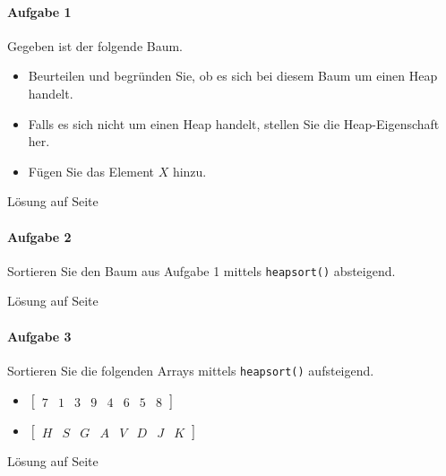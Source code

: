 \documentclass[11pt,a4paper]{scrartcl}
\begin{document}
\paragraph{Aufgabe 1} Gegeben ist der folgende Baum.
\begin{itemize}
\item Beurteilen und begründen Sie, ob es sich bei diesem Baum um einen Heap handelt.
\item Falls es sich nicht um einen Heap handelt, stellen Sie die Heap-Eigenschaft her.
\item Fügen Sie das Element $X$ hinzu.
\end{itemize}
\begin{figure}[h]
\centering
{}
\end{figure}
\begin{flushright}
Lösung auf Seite \pageref{a5.1:lsg} \\
\end{flushright}
\paragraph{Aufgabe 2} 
Sortieren Sie den Baum aus Aufgabe 1 mittels \texttt{heapsort()} absteigend.
\begin{flushright}
Lösung auf Seite \pageref{a5.2:lsg}
\end{flushright}
\paragraph{Aufgabe 3}
Sortieren Sie die folgenden Arrays mittels \texttt{heapsort()} aufsteigend.
\begin{itemize}
\item $\left[ \begin{array}{rrrrrrrr}
7 & 1 & 3 & 9 & 4 & 6 & 5 & 8 
\end{array} \right]$
\item $\left[ \begin{array}{rrrrrrrr}
H & S & G & A & V & D & J & K 
\end{array} \right]$
\end{itemize} 
\begin{flushright}
Lösung auf Seite \pageref{a5.3:lsg}
\end{flushright}
\end{document}
